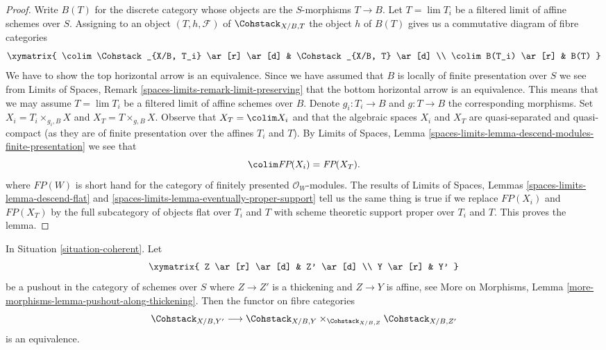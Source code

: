 \begin{proof}
Write $B(T)$ for the discrete category whose
objects are the $S$-morphisms $T \to B$. Let $T = \lim T_i$ be a filtered
limit of affine schemes over $S$. Assigning to an object
$(T, h, \mathcal{F})$ of $\Cohstack_{X/B, T}$ the object $h$
of $B(T)$ gives us a commutative diagram of fibre categories
$$
\xymatrix{
\colim \Cohstack_{X/B, T_i} \ar[r] \ar[d] &
\Cohstack_{X/B, T} \ar[d] \\
\colim B(T_i) \ar[r] & B(T)
}
$$
We have to show the top horizontal arrow is an equivalence. Since
we have assumed that $B$ is locally of finite presentation over $S$
we see from
Limits of Spaces, Remark \ref{spaces-limits-remark-limit-preserving}
that the bottom horizontal arrow is an equivalence. This means that
we may assume $T = \lim T_i$ be a filtered limit of affine schemes over
$B$. Denote $g_i : T_i \to B$ and $g : T \to B$ the corresponding
morphisms. Set $X_i = T_i \times_{g_i, B} X$ and $X_T = T \times_{g, B} X$.
Observe that $X_T = \colim X_i$ and that the algebraic spaces
$X_i$ and $X_T$ are quasi-separated and quasi-compact (as they
are of finite presentation over the affines $T_i$ and $T$).
By Limits of Spaces, Lemma
\ref{spaces-limits-lemma-descend-modules-finite-presentation}
we see that
$$
\colim \textit{FP}(X_i) = \textit{FP}(X_T).
$$
where $\textit{FP}(W)$ is short hand for the category of finitely
presented $\mathcal{O}_W$-modules. The results of
Limits of Spaces, Lemmas \ref{spaces-limits-lemma-descend-flat} and
\ref{spaces-limits-lemma-eventually-proper-support}
tell us the same thing is true if we replace $\textit{FP}(X_i)$
and $\textit{FP}(X_T)$ by the full subcategory of objects
flat over $T_i$ and $T$ with scheme theoretic support proper
over $T_i$ and $T$. This proves the lemma.
\end{proof}

\begin{lemma}
\label{lemma-coherent-RS-star}
In Situation \ref{situation-coherent}. Let
$$
\xymatrix{
Z \ar[r] \ar[d] & Z' \ar[d] \\
Y \ar[r] & Y'
}
$$
be a pushout in the category of schemes over $S$ where
$Z \to Z'$ is a thickening and $Z \to Y$ is affine, see
More on Morphisms, Lemma \ref{more-morphisms-lemma-pushout-along-thickening}.
Then the functor on fibre categories
$$
\Cohstack_{X/B, Y'}
\longrightarrow
\Cohstack_{X/B, Y} \times_{\Cohstack_{X/B, Z}} \Cohstack_{X/B, Z'}
$$
is an equivalence.
\end{lemma}

